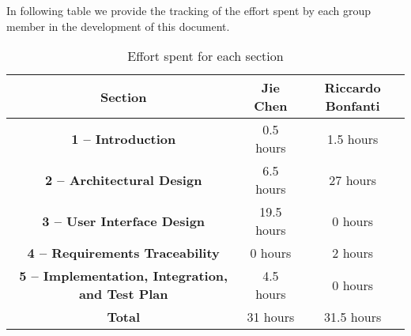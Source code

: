 In following table we provide the tracking of the effort spent by each group member in the development of this document.
\begin{table}[H]
    \centering
    \begin{tabular}{|c|c|c|}
    \hline
    \rowcolor{bluepoli!40}
    \textbf{Section} & \textbf{Jie Chen} & \textbf{Riccardo Bonfanti} \T\B \\
    \hline
     \textbf{1 – Introduction}                  & 0.5 hours & 1.5 hours \T\B \\
     \textbf{2 – Architectural Design}           & 6.5 hours & 27 hours \T\B\\
     \textbf{3 – User Interface Design}         & 19.5 hours & 0 hours \T\B\\
     \textbf{4 – Requirements Traceability}   & 0 hours & 2 hours  \T\B \\
     \textbf{5 – Implementation, Integration, and Test Plan}   & 4.5 hours & 0 hours  \T\B \\
     \hline
     \textbf{Total}                             & 31 hours & 31.5 hours \T\B \\

    \hline
    \end{tabular}
    \\[10pt]
    \caption{Effort spent for each section}\label{table:effort}
\end{table}